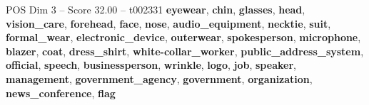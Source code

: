 \begin{textsample}{POS Dim 3 – Score 32.00 – t002331}  \label{ex:f3_pos_014}
\textbf{eyewear}, \textbf{chin}, \textbf{glasses}, \textbf{head}, \textbf{vision\_care}, \textbf{forehead}, \textbf{face}, \textbf{nose}, \textbf{audio\_equipment}, \textbf{necktie}, \textbf{suit}, \textbf{formal\_wear}, \textbf{electronic\_device}, \textbf{outerwear}, \textbf{spokesperson}, \textbf{microphone}, \textbf{blazer}, \textbf{coat}, \textbf{dress\_shirt}, \textbf{white-collar\_worker}, \textbf{public\_address\_system}, \textbf{official}, \textbf{speech}, \textbf{businessperson}, \textbf{wrinkle}, \textbf{logo}, \textbf{job}, \textbf{speaker}, \textbf{management}, \textbf{government\_agency}, \textbf{government}, \textbf{organization}, \textbf{news\_conference}, \textbf{flag}

\end{textsample}
